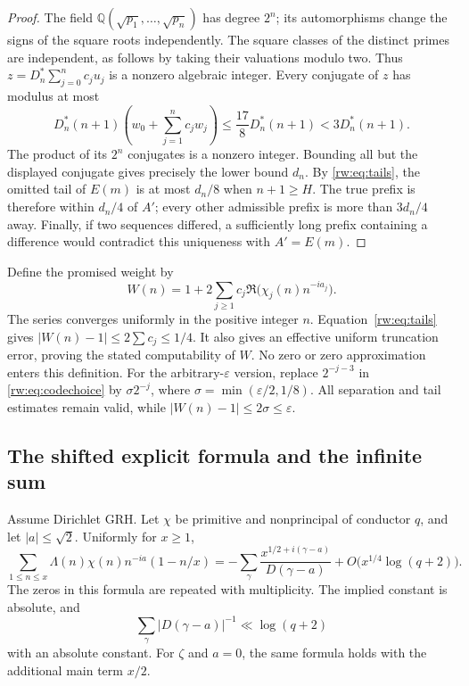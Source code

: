 \begin{proof}
The field $\mathbb Q(\sqrt{p_1},\ldots,\sqrt{p_n})$ has degree $2^n$;
its automorphisms change the signs of the square roots independently.
The square classes of the distinct primes are independent, as follows
by taking their valuations modulo two. Thus
$z=D_n^*\sum_{j=0}^nc_ju_j$ is a nonzero algebraic integer. Every conjugate
of $z$ has modulus at most
\[
 D_n^*(n+1)\left(w_0+\sum_{j=1}^nc_jw_j\right)
 \le\frac{17}{8}D_n^*(n+1)<3D_n^*(n+1).
\]
The product of its $2^n$ conjugates is a nonzero integer. Bounding all
but the displayed conjugate gives precisely the lower bound $d_n$.
By \eqref{rw:eq:tails}, the omitted tail of $E(m)$ is at most $d_n/8$
when $n+1\ge H$. The true prefix is therefore within $d_n/4$ of $A'$;
every other admissible prefix is more than $3d_n/4$ away. Finally, if two
sequences differed, a sufficiently long prefix containing a difference
would contradict this uniqueness with $A'=E(m)$.
\end{proof}

Define the promised weight by
\begin{equation}\label{rw:eq:weight}
 W(n)=1+2\sum_{j\ge1}c_j
       \Re\bigl(\chi_j(n)n^{-ia_j}\bigr).
\end{equation}
The series converges uniformly in the positive integer $n$.
Equation~\eqref{rw:eq:tails} gives $|W(n)-1|\le2\sum c_j\le1/4$.
It also gives an effective uniform truncation error, proving the stated
computability of $W$. No zero or zero approximation enters this definition.
For the arbitrary-$\varepsilon$ version, replace $2^{-j-3}$ in
\eqref{rw:eq:codechoice} by $\sigma2^{-j}$, where
$\sigma=\min(\varepsilon/2,1/8)$. All separation and tail estimates remain
valid, while $|W(n)-1|\le2\sigma\le\varepsilon$.

\subsection{The shifted explicit formula and the infinite sum}

\begin{lemma}\label{rw:lem:explicit}
Assume Dirichlet GRH. Let $\chi$ be primitive and nonprincipal of conductor
$q$, and let $|a|\le\sqrt2$. Uniformly for $x\ge1$,
\begin{equation}\label{rw:eq:shifted}
 \sum_{1\le n\le x}\Lambda(n)\chi(n)n^{-ia}(1-n/x)
 =-\sum_\gamma
 \frac{x^{1/2+i(\gamma-a)}}{D(\gamma-a)}
 +O\bigl(x^{1/4}\log(q+2)\bigr).
\end{equation}
The zeros in this formula are repeated with multiplicity. The implied
constant is absolute, and
\begin{equation}\label{rw:eq:abssum}
 \sum_\gamma |D(\gamma-a)|^{-1}\ll\log(q+2)
\end{equation}
with an absolute constant. For $\zeta$ and $a=0$, the same formula holds
with the additional main term $x/2$.
\end{lemma}

